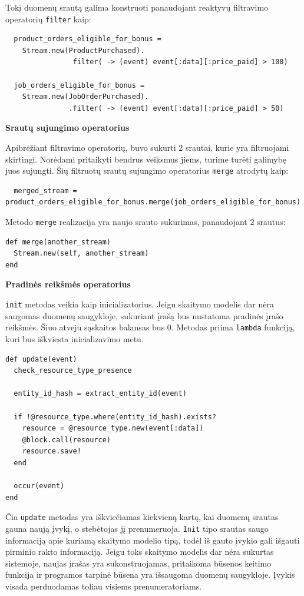 Tokį duomenų srautą galima konstruoti panaudojant reaktyvų filtravimo operatorių \lstinline|filter| kaip:

\begin{lstlisting}
  product_orders_eligible_for_bonus =
    Stream.new(ProductPurchased).
                filter( -> (event) event[:data][:price_paid] > 100)

  job_orders_eligible_for_bonus =
    Stream.new(JobOrderPurchased).
               .filter( -> (event) event[:data][:price_paid] > 50)
\end{lstlisting}

\textbf{Srautų sujungimo operatorius}

Apibrėžiant filtravimo operatorių, buvo sukurti 2 srautai, kurie yra filtruojami skirtingi. Norėdami pritaikyti bendrus veiksmus jiems, turime turėti galimybę juos sujungti. Šių filtruotų srautų sujungimo operatorius \lstinline|merge| atrodytų kaip:

\begin{lstlisting}
  merged_stream = product_orders_eligible_for_bonus.merge(job_orders_eligible_for_bonus)
\end{lstlisting}

Metodo \lstinline|merge| realizacija yra naujo srauto sukūrimas, panaudojant 2 srautus:

\begin{lstlisting}
def merge(another_stream)
  Stream.new(self, another_stream)
end
\end{lstlisting}

\textbf{Pradinės reikšmės operatorius}

\lstinline|init| metodas veikia kaip inicializatorius. Jeigu skaitymo modelis dar nėra saugomas duomenų saugykloje, sukuriant įrašą bus nustatoma pradinės įrašo reikšmės. Šiuo atveju sąskaitos balansas bus 0. Metodas priima \lstinline|lambda| funkciją, kuri bus iškviesta inicializavimo metu.

\begin{lstlisting}
def update(event)
  check_resource_type_presence

  entity_id_hash = extract_entity_id(event)

  if !@resource_type.where(entity_id_hash).exists?
    resource = @resource_type.new(event[:data])
    @block.call(resource)
    resource.save!
  end

  occur(event)
end
\end{lstlisting}

Čia \lstinline|update| metodas yra iškviečiamas kiekvieną kartą, kai duomenų srautas gauna naują įvykį, o stebėtojas jį prenumeruoja. \lstinline|Init| tipo srautas saugo informaciją apie kuriamą skaitymo modelio tipą, todėl iš gauto įvykio gali išgauti pirminio rakto informaciją. Jeigu toks skaitymo modelis dar nėra sukurtas sistemoje, naujas įrašas yra sukonstruojamas, pritaikoma būsenos keitimo funkcija ir programos tarpinė būsena yra išsaugoma duomenų saugykloje. Įvykis visada perduodamas toliau visiems prenumeratoriams.

